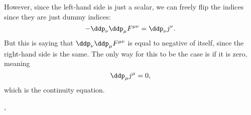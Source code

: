 \begin{itemize}
\begin{equation*}
        \end{equation*}
        However, since the left-hand side is just a scalar, we can freely flip the indices since they are just dummy indices:   
        \begin{equation*}
            -\ddp_{\nu}\ddp_{\mu}F^{\mu\nu} = \ddp_{\nu}j^{\nu}.
        \end{equation*}
        But this is saying that $\ddp_{\nu}\ddp_{\mu}F^{\mu\nu}$ is equal to negative of itself, since the right-hand side is the same. The only way for this to be the case is if it is zero, meaning
        \begin{equation}
            \ddp_{\mu}j^{\mu} = 0,
        \end{equation}
        which is the continuity equation.
\end{itemize}

\sep

